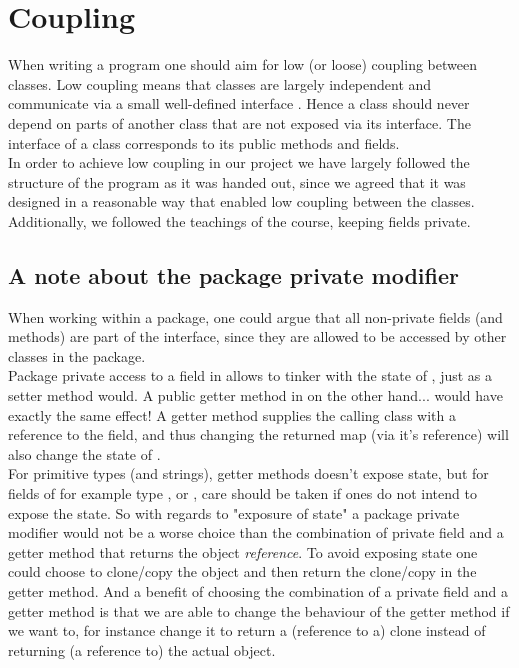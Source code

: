 \section{Coupling}
When writing a program one should aim for low (or loose) coupling between classes. Low coupling means that classes are largely independent and communicate via a small well-defined interface \cite[p.259]{BK}. Hence a class should never depend on parts of another class that are not exposed via its interface. The interface of a class corresponds to its public methods and fields.
\\
In order to achieve low coupling in our project we have largely followed the structure of the program as it was handed out, since we agreed that it was designed in a reasonable way that enabled low coupling between the classes. Additionally, we followed the teachings of the course, keeping fields private.

\subsection{A note about the package private modifier}
When working within a package, one could argue that all non-private fields (and methods) are part of the interface, since they are allowed to be accessed by other classes in the package. 
\\
Package private access to a field in  allows  to tinker with the state of , just as a setter method would.
A public getter method in  on the other hand... would have exactly the same effect!
A getter method supplies the calling class  with a reference to the field, and thus changing the returned map (via it's reference) will also change the state of .
\\
For primitive types (and strings), getter methods doesn't expose state, but for fields of for example type ,  or , care should be taken if ones do not intend to expose the state.
So with regards to "exposure of state" a package private modifier would not be a worse choice than the combination of private field and a getter method that returns the object \emph{reference}. To avoid exposing state one could choose to clone/copy the object and then return the clone/copy in the getter method.
And a benefit of choosing the combination of a private field and a getter method is that we are able to change the behaviour of the getter method if we want to, for instance change it to return a (reference to a) clone instead of returning (a reference to) the actual object. 

